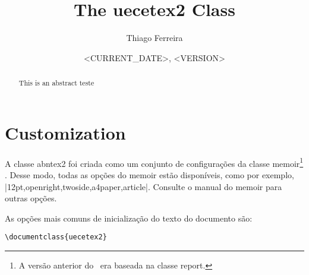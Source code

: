 \documentclass[letterpaper]{ltxdoc}
\title{The \textsf{uecetex2} Class}
\author{Thiago Ferreira}
\date{<CURRENT_DATE>, <VERSION>}
\begin{document}
\maketitle

\begin{abstract}
    This is an abstract teste
\end{abstract}

\tableofcontents

\section{Customization}
\label{sec:customization}

\DescribeMacro{\documentclass}
A classe \textsf{abntex2} foi criada como um conjunto de configurações da classe
\textsf{memoir}\footnote{A versão anterior do ~era baseada na classe
\textsf{report}.} \cite{memoir}. Desse modo, todas as opções do \textsf{memoir}
estão disponíveis, como por exemplo, |12pt,openright,twoside,a4paper,article|.
Consulte o manual do \textsf{memoir} para outras opções.

As opções mais comuns de inicialização do texto do documento são:

\begin{verbatim}
\documentclass{uecetex2}
\end{verbatim}
\end{document}
